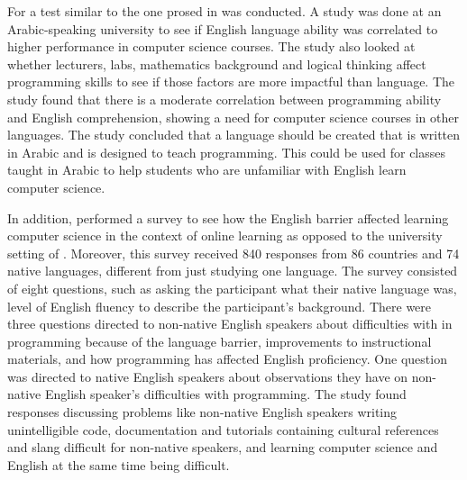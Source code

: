 \documentclass[10pt,twocolumn]{article}
\begin{document}
For \textcite{Idris2018Correlation} a test similar to the one prosed in \textcite{Veerasamy2014Teaching} was conducted. A study was done at an Arabic-speaking university to see if English language ability was correlated to higher performance in computer science courses. The study also looked at whether lecturers, labs, mathematics background and logical thinking affect programming skills to see if those factors are more impactful than language. The study found that there is a moderate correlation between programming ability and English comprehension, showing a need for computer science courses in other languages. The study concluded that a language should be created that is written in Arabic and is designed to teach programming. This could be used for classes taught in Arabic to help students who are unfamiliar with English learn computer science.

In addition, \textcite{Guo2018Non} performed a survey to see how the English barrier affected learning computer science in the context of online learning as opposed to the university setting of \textcite{Idris2018Correlation}. Moreover, this survey received 840 responses from 86 countries and 74 native languages, different from just studying one language. The survey consisted of eight questions, such as asking the participant what their native language was, level of English fluency to describe the participant's background. There were three questions directed to non-native English speakers about difficulties with in programming because of the language barrier, improvements to instructional materials, and how programming has affected English proficiency. One question was directed to native English speakers about observations they have on non-native English speaker's difficulties with programming. The study found responses discussing problems like non-native English speakers writing unintelligible code, documentation and tutorials containing cultural references and slang difficult for non-native speakers, and learning computer science and English at the same time being difficult.
\end{document}
